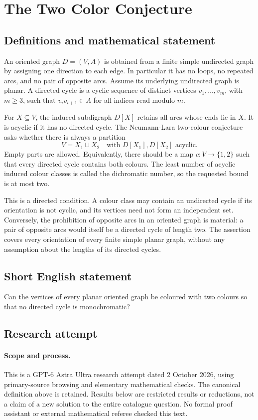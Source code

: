 \documentclass[11pt,a4paper]{article}
\begin{document}
\section*{The Two Color Conjecture}\label{statement}

\subsection{Definitions and mathematical statement}
An oriented graph $D=(V,A)$ is obtained from a finite simple undirected
graph by assigning one direction to each edge. In particular it has no
loops, no repeated arcs, and no pair of opposite arcs. Assume its
underlying undirected graph is planar. A directed cycle is a cyclic
sequence of distinct vertices $v_1,\ldots,v_m$, with $m\ge3$, such that
$v_i v_{i+1}\in A$ for all indices read modulo $m$.

For $X\subseteq V$, the induced subdigraph $D[X]$ retains all arcs whose
ends lie in $X$. It is acyclic if it has no directed cycle. The
Neumann-Lara two-colour conjecture asks whether there is always a
partition
\[
                  V=X_1\sqcup X_2
                  \quad\text{with }D[X_1],D[X_2]\text{ acyclic}.
\]
Empty parts are allowed. Equivalently, there should be a map
$c:V\to\{1,2\}$ such that every directed cycle contains both colours.
The least number of acyclic induced colour classes is called the
dichromatic number, so the requested bound is at most two.

This is a directed condition. A colour class may contain an undirected
cycle if its orientation is not cyclic, and its vertices need not form
an independent set. Conversely, the prohibition of opposite arcs in an
oriented graph is material: a pair of opposite arcs would itself be a
directed cycle of length two. The assertion covers every orientation of
every finite simple planar graph, without any assumption about the
lengths of its directed cycles.
\subsection{Short English statement}
Can the vertices of every planar oriented graph be coloured with two colours so that no directed cycle is monochromatic?
\subsection{Research attempt}
\paragraph{Scope and process.}
This is a GPT-6 Astra Ultra research attempt dated 2 October 2026, using
primary-source browsing and elementary mathematical checks. The canonical
definition above is retained. Results below are restricted results or
reductions, not a claim of a new solution to the entire catalogue question.
No formal proof assistant or external mathematical referee checked this text.
\end{document}
